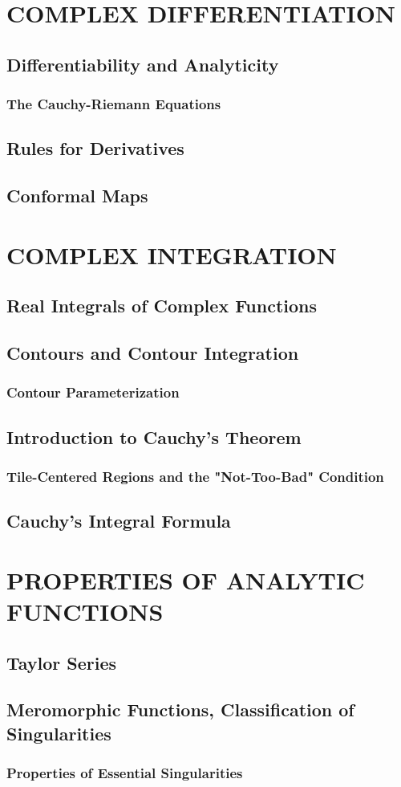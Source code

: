 \documentclass[hidelinks,12pt]{article}
\theoremstyle{definition}
\begin{document}
  \section{COMPLEX DIFFERENTIATION}
  \subsection{Differentiability and Analyticity}
  \subsubsection{The Cauchy-Riemann Equations}
  \subsection{Rules for Derivatives}
  \subsection{Conformal Maps}


  \section{COMPLEX INTEGRATION}
  \subsection{Real Integrals of Complex Functions}
  \subsection{Contours and Contour Integration}
  \subsubsection{Contour Parameterization}
  \subsection{Introduction to Cauchy's Theorem}
  \subsubsection{Tile-Centered Regions and the "Not-Too-Bad" Condition}
  \subsection{Cauchy's Integral Formula}

  \section{PROPERTIES OF ANALYTIC FUNCTIONS}
  \subsection{Taylor Series}
  \subsection{Meromorphic Functions, Classification of Singularities}
  \subsubsection{Properties of Essential Singularities}
\end{document}
